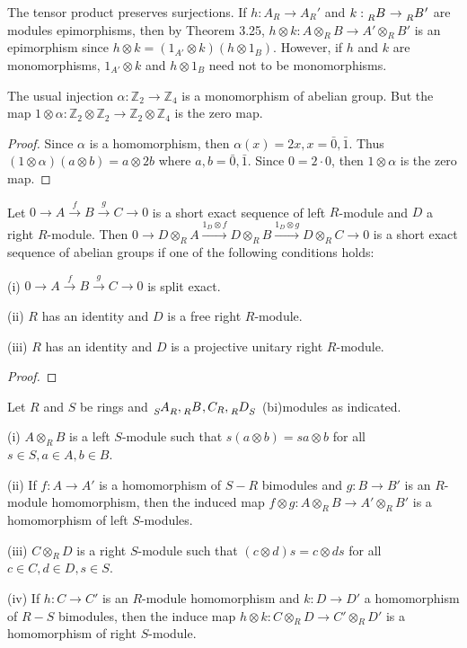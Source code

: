 \documentclass{article}
\begin{document}
The tensor product preserves surjections. If $h:A_R\to A_R'$ and $k:\tensor[_R]{B}{}\to\tensor[_R]{B}{}'$ are modules epimorphisms, then by Theorem 3.25, $h\otimes k: A\otimes_R B\to A'\otimes_R B'$ is an epimorphism since $h\otimes k=(1_{A'}\otimes k)(h\otimes 1_B)$. However, if $h$ and $k$ are monomorphisms, $1_{A'}\otimes k$ and $h\otimes 1_B$ need not to be monomorphisms.
\begin{example}
    The usual injection $\alpha:\mathbb{Z}_2\to \mathbb{Z}_4$ is a monomorphism of abelian group. But the map $1\otimes \alpha: \mathbb{Z}_2\otimes \mathbb{Z}_2\to \mathbb{Z}_2\otimes \mathbb{Z}_4$ is the zero map.
\end{example}
\begin{proof}
    Since $\alpha$ is a homomorphism, then $\alpha(x)=2x,x=\bar{0},\bar{1}$. Thus $(1\otimes \alpha)(a\otimes b)=a\otimes 2b$ where $a,b=\bar{0},\bar{1}$. Since $0=2\cdot 0$, then $1\otimes \alpha$ is the zero map.
\end{proof}

\begin{theorem}
    Let $0\to A\xrightarrow{f}B\xrightarrow{g}C\to 0$ is a short exact sequence of left $R$-module and $D$ a right $R$-module. Then $0\to D\otimes_R A\xrightarrow{1_D \otimes f}D\otimes_R B\xrightarrow{1_D \otimes g}D \otimes_R C\to 0$ is a short exact sequence of abelian groups if one of the following conditions holds:
    
    (i) $0\to A\xrightarrow{f}B\xrightarrow{g}C\to 0$ is split exact.

    (ii) $R$ has an identity and $D$ is a free right $R$-module.

    (iii) $R$ has an identity and $D$ is a projective unitary right $R$-module.
\end{theorem}
\begin{proof}
    
\end{proof}

\begin{theorem}
    Let $R$ and $S$ be rings and $\tensor[_S]{A}{_R},\tensor[_R]{B}{},C_R,\tensor[_R]{D}{_S}$ (bi)modules as indicated.

    (i) $A\otimes_R B$ is a left $S$-module such that $s(a\otimes b)=sa\otimes b$ for all $s \in S, a \in A, b \in B$.

    (ii) If $f:A\to A'$ is a homomorphism of $S-R$ bimodules and $g:B\to B'$ is an $R$-module homomorphism, then the induced map $f\otimes g:A\otimes_R B\to A'\otimes_R B'$ is a homomorphism of left $S$-modules.

    (iii) $C\otimes_R D$ is a right $S$-module such that $(c\otimes d)s=c\otimes ds$ for all $c \in C, d \in D, s \in S$.

    (iv) If $h:C\to C'$ is an $R$-module homomorphism and $k:D\to D'$ a homomorphism of $R-S$ bimodules, then the induce map $h\otimes k:C\otimes_R D\to C'\otimes_R D'$ is a homomorphism of right $S$-module.
\end{theorem}
\end{document}
